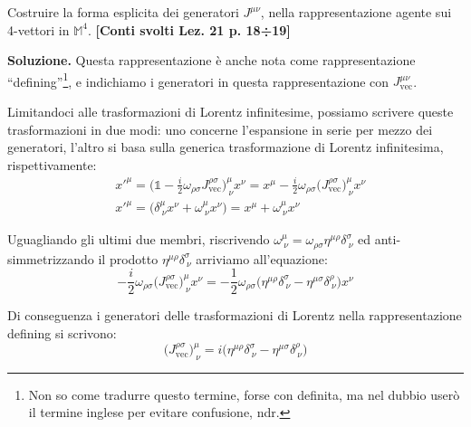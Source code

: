 \documentclass[../main.tex]{subfiles}
\begin{document}
\begin{exercise}
    \label{ex:vec_generators_form}
    Costruire la forma esplicita dei generatori $J^{\mu\nu}$, nella rappresentazione agente sui 4-vettori in $\mathbb M^4$. \textbf{[Conti svolti Lez. 21 p. 18÷19]}

    \textbf{Soluzione. } Questa rappresentazione è anche nota come rappresentazione “defining”\footnote{Non so come tradurre questo termine, forse con definita, ma nel dubbio userò il termine inglese per evitare confusione, ndr.}, e indichiamo i generatori in questa rappresentazione con \(J^{\mu\nu}_\text{vec}\).

    Limitandoci alle trasformazioni di Lorentz infinitesime, possiamo scrivere queste trasformazioni in due modi: uno concerne l'espansione in serie per mezzo dei generatori, l'altro si basa sulla generica trasformazione di Lorentz infinitesima, rispettivamente:
    \begin{align*}
        &x'^\mu = \Big(\mathbb 1 -\frac{i}{2}\omega_{\rho\sigma}J^{\rho\sigma}_\text{vec}\Big)^\mu_{~\nu}x^\nu = x^\mu -\frac{i}{2}\omega_{\rho\sigma}\big(J^{\rho\sigma}_\text{vec}\big)^\mu_{~\nu}x^\nu\\
        &x'^\mu = \big(\delta^\mu_{~\nu}x^\nu + \omega^\mu_{~\nu}x^\nu\big) = x^\mu +  \omega^\mu_{~\nu}x^\nu
    \end{align*}

    Uguagliando gli ultimi due membri, riscrivendo \(\omega^\mu_{~\nu} = \omega_{\rho\sigma}\eta^{\mu\rho}\delta^\sigma_{~\nu}\) ed anti-simmetrizzando il prodotto \(\eta^{\mu\rho}\delta^\sigma_{~\nu}\) arriviamo all'equazione:
    \[
    -\frac{i}{2}\omega_{\rho\sigma}\big(J^{\rho\sigma}_\text{vec}\big)^\mu_{~\nu}x^\nu = 
    -\frac{1}{2}\omega_{\rho\sigma}\big(\eta^{\mu\rho}\delta^\sigma_{~\nu} - \eta^{\mu\sigma}\delta^\rho_{~\nu}\big)x^\nu
    \]

    Di conseguenza i generatori delle trasformazioni di Lorentz nella rappresentazione defining si scrivono:
    \begin{equation}
        \boxed{\big(J^{\rho\sigma}_\text{vec}\big)^\mu_{~\nu} = i\big(\eta^{\mu\rho}\delta^\sigma_{~\nu} - \eta^{\mu\sigma}\delta^\rho_{~\nu}\big)}
        \label{eq:lorentz_gen_defining_rep}
    \end{equation}


\end{exercise}
\end{document}
